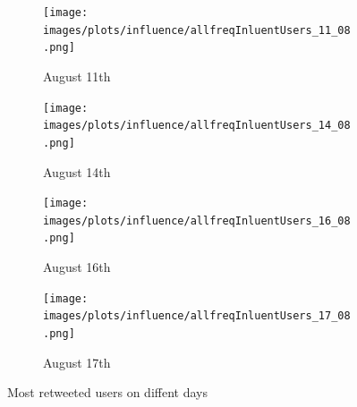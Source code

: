 \documentclass[a4paper,twoside,12pt,openright]{report}
\newcommand{\toprt}[1]{
\pgfplotstableread[col sep=comma, ignore chars={\",\\,\#}]{#1}{\table}

\pgfplotstabletypeset[
	columns/content/.style={column type=C},
	string type,
	every head row/.style={
        before row={\toprule}, %
        after row={
            \midrule} %
            },
    after row={\midrule}, %
    every last row/.style={after row=\bottomrule}, %
    ] {\table}
}
\begin{document}
\begin{figure}[H]
\begin{subfigure}[t]{0.5\textwidth}
\begin{center}
	\texttt{[image: images/plots/influence/allfreqInluentUsers\_11\_08.png]}
	\caption{August 11th}
	\label{activitiesPlots11}
\end{center}
\end{subfigure}
\hfill
\begin{subfigure}[t]{0.5\textwidth}
\begin{center}
	\texttt{[image: images/plots/influence/allfreqInluentUsers\_14\_08.png]}
	\caption{August 14th}
	\label{activitiesPlots14}
\end{center}
\end{subfigure}

\begin{subfigure}[t]{0.5\textwidth}
\begin{center}
	\texttt{[image: images/plots/influence/allfreqInluentUsers\_16\_08.png]}
	\caption{August 16th}
	\label{activitiesPlots16}
\end{center}
\end{subfigure}
\hfill
\begin{subfigure}[t]{0.5\textwidth}
\begin{center}
	\texttt{[image: images/plots/influence/allfreqInluentUsers\_17\_08.png]}
	\caption{August 17th}
	\label{activitiesPlots17}
\end{center}
\end{subfigure}
\caption{Most retweeted users on diffent days}
\label{activitiesPlots}
\end{figure}


\end{document}

